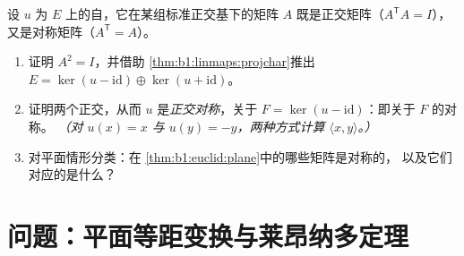 \begin{exercise}[$\star\star\star$]\label{exo:b1:euclid:12}
设 $u$ 为 $E$ 上的自，它在某组标准正交基下的矩阵
$A$ 既是正交矩阵（$A^{\mathsf T}A
= I$），又是对称矩阵（$A^{\mathsf T} = A$）。
\begin{enumerate}
  \item 证明 $A^2 = I$，并借助
        \cref{thm:b1:linmaps:projchar}推出 $E = \ker(u -
        \mathrm{id}) \oplus \ker(u + \mathrm{id})$。
  \item 证明两个正交，从而 $u$
        是\emph{正交对称}，关于 $F =
        \ker(u - \mathrm{id})$：即关于 $F$ 的对称。
        \emph{（对 $u(x) = x$ 与 $u(y) = -y$，两种方式计算 $\langle
        x, y\rangle$。）}
  \item 对平面情形分类：在
        \cref{thm:b1:euclid:plane}中的哪些矩阵是对称的，
        以及它们对应的是什么？
\end{enumerate}
\end{exercise}

\section{问题：平面等距变换与莱昂纳多定理}

